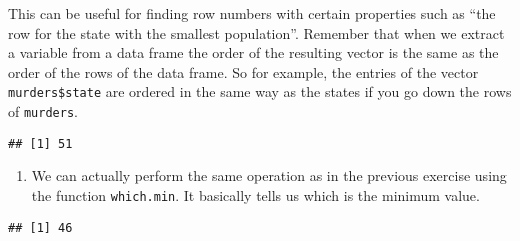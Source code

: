 \documentclass[
]{article}
\newenvironment{Shaded}{\begin{snugshade}}{\end{snugshade}}
\newcommand{\CommentTok}[1]{\textcolor[rgb]{0.56,0.35,0.01}{\textit{#1}}}
\newcommand{\DecValTok}[1]{\textcolor[rgb]{0.00,0.00,0.81}{#1}}
\newcommand{\KeywordTok}[1]{\textcolor[rgb]{0.13,0.29,0.53}{\textbf{#1}}}
\newcommand{\NormalTok}[1]{#1}
\newcommand{\OperatorTok}[1]{\textcolor[rgb]{0.81,0.36,0.00}{\textbf{#1}}}
\newcommand{\StringTok}[1]{\textcolor[rgb]{0.31,0.60,0.02}{#1}}
\providecommand{\tightlist}{%
  \setlength{\itemsep}{0pt}\setlength{\parskip}{0pt}}
\begin{document}
This can be useful for finding row numbers with certain properties such
as ``the row for the state with the smallest population''. Remember that
when we extract a variable from a data frame the order of the resulting
vector is the same as the order of the rows of the data frame. So for
example, the entries of the vector \texttt{murders\$state} are ordered
in the same way as the states if you go down the rows of
\texttt{murders}.

\begin{Shaded}
\end{Shaded}

\begin{verbatim}
## [1] 51
\end{verbatim}

\begin{enumerate}
\def\labelenumi{\arabic{enumi}.}
\setcounter{enumi}{2}
\tightlist
\item
  We can actually perform the same operation as in the previous exercise
  using the function \texttt{which.min}. It basically tells us which is
  the minimum value.
\end{enumerate}

\begin{Shaded}
\end{Shaded}

\begin{verbatim}
## [1] 46
\end{verbatim}

\begin{Shaded}
\end{Shaded}
\end{document}
